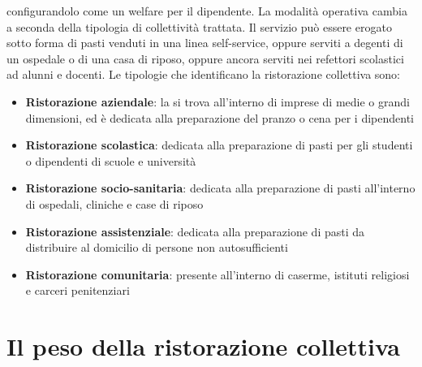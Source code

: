 \documentclass[a4paper, titlepage, 12pt, openright, twoside]{book}
\begin{document}
\begin{itemize}
											configurandolo come un welfare per il dipendente. La modalità operativa cambia a seconda della tipologia di collettività trattata.
											Il servizio può essere erogato sotto forma di pasti venduti in una linea self-service, oppure serviti a degenti di un ospedale o di una
											casa di riposo, oppure ancora serviti nei refettori scolastici ad alunni e docenti.
											Le tipologie che identificano la ristorazione collettiva sono:
											\begin{itemize}
												\item \textbf{Ristorazione aziendale}: la si trova all'interno di imprese di medie o grandi dimensioni, ed è dedicata alla preparazione
																						del pranzo o cena per i dipendenti
												\item \textbf{Ristorazione scolastica}: dedicata alla preparazione di pasti per gli studenti o dipendenti di scuole e università
												\item \textbf{Ristorazione socio-sanitaria}: dedicata alla preparazione di pasti all'interno di ospedali, cliniche e case di riposo
												\item \textbf{Ristorazione assistenziale}: dedicata alla preparazione di pasti da distribuire al domicilio di persone 
																							non autosufficienti
												\item \textbf{Ristorazione comunitaria}: presente all'interno di caserme, istituti religiosi e carceri penitenziari
											\end{itemize}
\end{itemize}

\section{Il peso della ristorazione collettiva}
\end{document}
